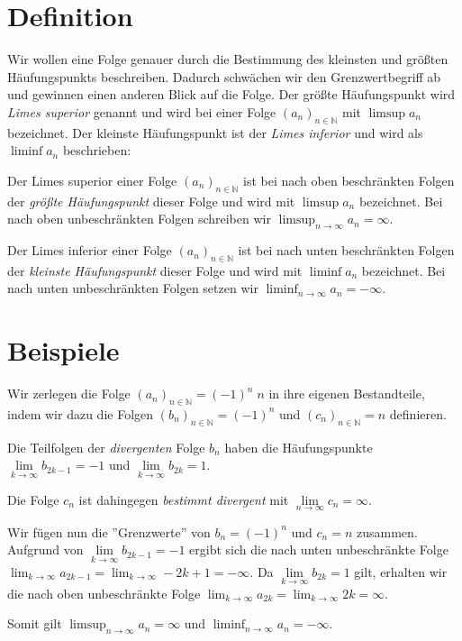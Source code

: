 \documentclass[fontsize=9pt,
               parskip=half-,
               DIV=14,
               listof=chapterentry,
               tocflat]{scrbook}
\begin{document}
\section{Definition}

Wir wollen eine Folge genauer durch die Bestimmung des kleinsten und größten Häufungspunkts beschreiben. Dadurch schwächen wir den Grenzwertbegriff ab und gewinnen einen anderen Blick auf die Folge. Der größte Häufungspunkt wird \emph{Limes superior} genannt und wird bei einer Folge $(a_{n})_{n\in \mathbb {N} }$ mit $\limsup a_{n}$ bezeichnet. Der kleinste Häufungspunkt ist der \emph{Limes inferior} und wird als $\liminf a_{n}$ beschrieben:

\begin{definition*}
Der Limes superior einer Folge $(a_{n})_{n\in \mathbb {N} }$ ist bei nach oben beschränkten Folgen der \emph{größte Häufungspunkt} dieser Folge und wird mit $\limsup a_{n}$ bezeichnet. Bei nach oben unbeschränkten Folgen schreiben wir $\limsup _{n\to \infty }a_{n}=\infty $.

\end{definition*}

\begin{definition*}
Der Limes inferior einer Folge $(a_{n})_{n\in \mathbb {N} }$ ist bei nach unten beschränkten Folgen der \emph{kleinste Häufungspunkt} dieser Folge und wird mit $\liminf a_{n}$ bezeichnet. Bei nach unten unbeschränkten Folgen setzen wir $\liminf _{n\to \infty }a_{n}=-\infty $.

\end{definition*}

\section{Beispiele}

\begin{example*}
Wir zerlegen die Folge $(a_{n})_{n\in \mathbb {N} }=(-1)^{n}\;n$ in ihre eigenen Bestandteile, indem wir dazu die Folgen $(b_{n})_{n\in \mathbb {N} }=(-1)^{n}$ und $(c_{n})_{n\in \mathbb {N} }=n$ definieren.

Die Teilfolgen der \emph{divergenten} Folge $b_{n}$ haben die Häufungspunkte $\lim \limits _{k\to \infty }b_{2k-1}=-1$ und $\lim \limits _{k\to \infty }b_{2k}=1$.

Die Folge $c_{n}$ ist dahingegen \emph{bestimmt divergent} mit $\lim \limits _{n\to \infty }c_{n}=\infty $.

Wir fügen nun die {''}Grenzwerte{''} von $b_{n}=(-1)^{n}$ und $c_{n}=n$ zusammen. Aufgrund von $\lim \limits _{k\to \infty }b_{2k-1}=-1$ ergibt sich die nach unten unbeschränkte Folge $\lim _{k\to \infty }a_{2k-1}=\lim _{k\to \infty }-2k+1=-\infty $. Da $\lim \limits _{k\to \infty }b_{2k}=1$ gilt, erhalten wir die nach oben unbeschränkte Folge $\lim _{k\to \infty }a_{2k}=\lim _{k\to \infty }2k=\infty $.

Somit gilt $\limsup _{n\to \infty }a_{n}=\infty $ und $\liminf _{n\to \infty }a_{n}=-\infty $.

\end{example*}
\end{document}
